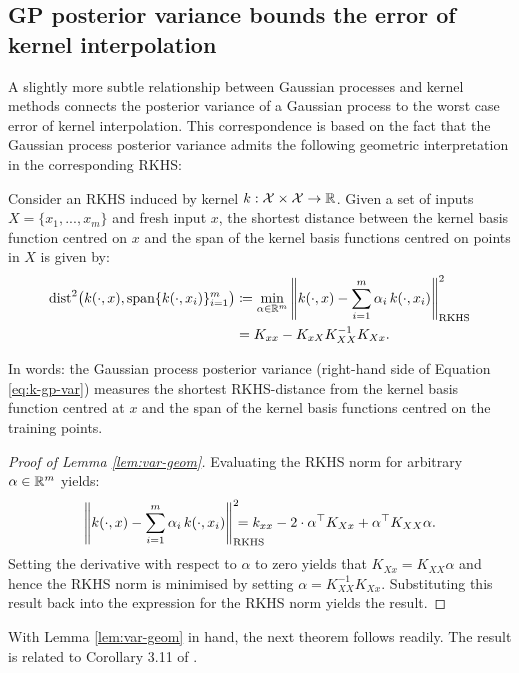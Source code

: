 \begin{refsection}
\section{GP posterior variance bounds the error of kernel interpolation}

A slightly more subtle relationship between Gaussian processes and kernel methods connects the posterior variance of a Gaussian process to the worst case error of kernel interpolation. This correspondence is based on the fact that the Gaussian process posterior variance admits the following geometric interpretation in the corresponding RKHS:
\begin{lemma}\label{lem:var-geom} Consider an RKHS induced by kernel $k:\mathcal{X}\times\mathcal{X}\to\mathbb{R}$. Given a set of inputs $X=\{x_1,...,x_m\}$ and fresh input $x$, the shortest distance between the kernel basis function centred on $x$ and the span of the kernel basis functions centred on points in $X$ is given by:
\begin{align}\label{eq:k-gp-var}
    \mathrm{dist}^2\big(k(\cdot,x), \mathrm{span}\{k(\cdot,x_i)\}_{i=1}^m\big)&\coloneqq \min_{\alpha\in\mathbb{R}^m}\left\|k(\cdot,x)-\sum_{i=1}^m\alpha_i\, k(\cdot,x_i)\right\|_{\mathrm{RKHS}}^2 \nonumber\\ &= K_{xx} - K_{xX}K_{XX}^{-1}K_{Xx}.
\end{align}
\end{lemma}
In words: the Gaussian process posterior variance (right-hand side of Equation \ref{eq:k-gp-var}) measures the shortest RKHS-distance from the kernel basis function centred at $x$ and the span of the kernel basis functions centred on the training points.
\begin{proof}[Proof of Lemma \ref{lem:var-geom}] Evaluating the RKHS norm for arbitrary $\alpha \in \mathbb{R}^m$ yields:
    \begin{equation*}
        \left\|k(\cdot,x)-\sum_{i=1}^m\alpha_i\, k(\cdot,x_i)\right\|_{\mathrlap{\mathrm{RKHS}}}^{\mathrlap{2}} = k_{xx} - 2\cdot\alpha^\top K_{Xx} + \alpha^\top K_{XX}\alpha.
    \end{equation*}
    Setting the derivative with respect to $\alpha$ to zero yields that $K_{Xx}=K_{XX}\alpha$ and hence the RKHS norm is minimised by setting $\alpha = K_{XX}^{-1}K_{Xx}$. Substituting this result back into the expression for the RKHS norm yields the result.
\end{proof}

With Lemma \ref{lem:var-geom} in hand, the next theorem follows readily. The result is related to Corollary 3.11 of \citet{Kanagawa2018GaussianPA}.


\end{refsection}
